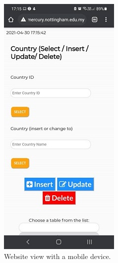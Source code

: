 \documentclass[openany]{article}
\begin{document}
		\begin{figure}[H]
			\includegraphics[width=\textwidth, height=\textheight, keepaspectratio]{Country (Mobile view)}
			\caption{Website view with a mobile device.}
		\end{figure}
\end{document}
